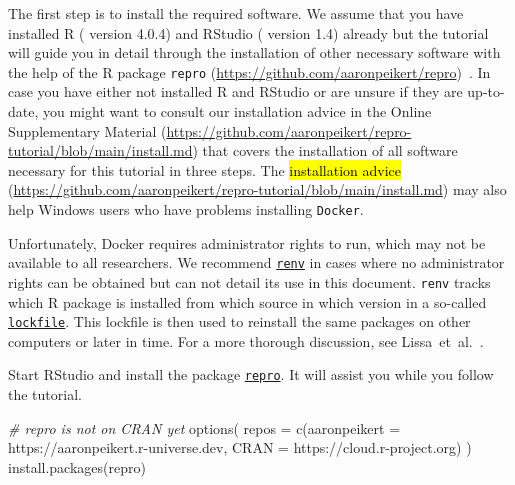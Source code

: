 \documentclass[psych,tutorial,accept,moreauthors,pdftex]{Definitions/mdpi}
\newenvironment{Shaded}{\begin{snugshade}}{\end{snugshade}}
\newcommand{\AttributeTok}[1]{\textcolor[rgb]{0.77,0.63,0.00}{#1}}
\newcommand{\CommentTok}[1]{\textcolor[rgb]{0.56,0.35,0.01}{\textit{#1}}}
\newcommand{\FunctionTok}[1]{\textcolor[rgb]{0.00,0.00,0.00}{#1}}
\newcommand{\NormalTok}[1]{#1}
\newcommand{\StringTok}[1]{\textcolor[rgb]{0.31,0.60,0.02}{#1}}
\begin{document}
The first step is to install the required software. We assume that you
have installed R (\citep{R-base} version 4.0.4) and RStudio
(\citep{rstudio} version 1.4) already but the tutorial will guide you in
detail through the installation of other necessary software with the
help of the R package {\texttt{repro}} 
(\url{https://github.com/aaronpeikert/repro})~\citep{R-repro}. In case you have either not installed R and RStudio or
are unsure if they are up-to-date, you might want to consult our
installation advice in the Online Supplementary Material
(\url{https://github.com/aaronpeikert/repro-tutorial/blob/main/install.md}) that covers the installation of all software
necessary for this tutorial in three steps. The
\hl{installation advice}
(\url{https://github.com/aaronpeikert/repro-tutorial/blob/main/install.md}) may also help Windows users who have problems installing
\texttt{Docker}.

Unfortunately, Docker requires administrator rights to run, which may
not be available to all researchers. We recommend
\href{https://rstudio.github.io/renv/articles/renv.html}{\texttt{renv}}
\citep{R-renv} in cases where no administrator rights can be obtained
but can not detail its use in this document. \texttt{renv} tracks which
R package is installed from which source in which version in a so-called
\href{https://rstudio.github.io/renv/articles/lockfile.html}{\texttt{lockfile}}.
This lockfile is then used to reinstall the same packages on other
computers or later in time. For a more thorough discussion, see
Lissa~et~al.~\citep{vanlissa2020worcs}.

Start RStudio and install the package
\href{https://github.com/aaronpeikert}{\texttt{repro}}\citep{R-repro}.
It will assist you while you follow the tutorial.

\begin{adjustwidth}{0.5cm}{0cm} 
\begin{Shaded}
\begin{Highlighting}[]
\CommentTok{\# repro is not on CRAN yet}
\FunctionTok{options}\NormalTok{(}
  \AttributeTok{repos =} \FunctionTok{c}\NormalTok{(}\AttributeTok{aaronpeikert =} \StringTok{\textquotesingle{}https://aaronpeikert.r{-}universe.dev\textquotesingle{}}\NormalTok{,}
            \AttributeTok{CRAN =} \StringTok{\textquotesingle{}https://cloud.r{-}project.org\textquotesingle{}}\NormalTok{)}
\NormalTok{)}
\FunctionTok{install.packages}\NormalTok{(}\StringTok{\textquotesingle{}repro\textquotesingle{}}\NormalTok{)}
\end{Highlighting}
\end{Shaded}
\end{adjustwidth}
\end{document}
